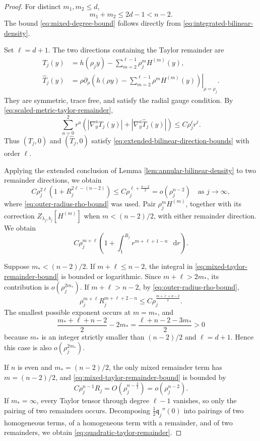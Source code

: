 \documentclass[11pt]{article}
\numberwithin{equation}{section}
\theoremstyle{remark}
\newcommand{\dd}{\mathop{}\!\mathrm{d}}
\begin{document}
\begin{proof}
For distinct \(m_1,m_2\le d\),
\[
 m_1+m_2\le2d-1<n-2.
\]
{The bound \eqref{eq:mixed-degree-bound} follows directly
from \eqref{eq:integrated-bilinear-density}.}

{Set \(\ell=d+1\).}
The two directions containing the Taylor remainder are
\[
 \begin{aligned}
 T_j(y)
 &=
 h(\rho_jy)-\sum_{m=2}^{\ell-1}\rho_j^mH^{(m)}(y),\\
 \widehat T_j(y)
 &=
 \left.\rho\partial_\rho\left(
 h(\rho y)-\sum_{m=2}^{\ell-1}\rho^mH^{(m)}(y)
 \right)\right|_{\rho=\rho_j}.
 \end{aligned}
\]
They are symmetric, trace free, and satisfy the radial gauge condition.
{By \eqref{eq:scaled-metric-taylor-remainder},}
\[
 \sum_{a=0}^2r^a
\left(
 |\nabla_y^aT_j(y)|
 +|\nabla_y^a\widehat T_j(y)|
\right)
 \le C\rho_j^{\ell}r^{\ell}.
\]
Thus \((T_j,0)\) and \((\widehat T_j,0)\) satisfy
\eqref{eq:extended-bilinear-direction-bounds} with order \(\ell\).

{Applying the extended conclusion of Lemma
\ref{lem:annular-bilinear-density} to two remainder directions, we obtain}
\[
 C\rho_j^{2\ell}
 \left(1+R_j^{2\ell-(n-2)}\right)
 \le
 C\rho_j^{\ell+\frac{n-2}{2}}
 =o(\rho_j^{n-2})
 \quad\text{as }j\to\infty,
\]
where \eqref{eq:outer-radius-rho-bound} was used.  {Pair
\(\rho_j^mH^{(m)}\), together with its correction
\(Z_{\lambda_j,b_j}[H^{(m)}]\) when
\(m<(n-2)/2\), with either remainder direction. We obtain}
\begin{equation}\label{eq:mixed-taylor-remainder-bound}
 C\rho_j^{m+\ell}
 \left(1+\int_1^{R_j}r^{m+\ell+1-n}\,\dd r\right).
\end{equation}

Suppose \(m_*<(n-2)/2\). If \(m+\ell\le n-2\), the integral in
\eqref{eq:mixed-taylor-remainder-bound} is bounded or logarithmic.
Since \(m+\ell>2m_*\), its contribution is \(o(\rho_j^{2m_*})\).
{If \(m+\ell>n-2\), by
\eqref{eq:outer-radius-rho-bound},}
\[
 \rho_j^{m+\ell}R_j^{m+\ell+2-n}
 \le
 C\rho_j^{\frac{m+\ell+n-2}{2}}.
\]
The smallest possible exponent occurs at \(m=m_*\), and
\[
 \frac{m_*+\ell+n-2}{2}-2m_*
 =
 \frac{\ell+n-2-3m_*}{2}>0
\]
because \(m_*\) is an integer strictly smaller than \((n-2)/2\) and
\(\ell=d+1\).  Hence this case is also
\(o(\rho_j^{2m_*})\).

If \(n\) is even and \(m_*=(n-2)/2\), the only mixed remainder term has
\(m=(n-2)/2\), and \eqref{eq:mixed-taylor-remainder-bound} is bounded by
\[
 C\rho_j^{n-1}R_j
 =O(\rho_j^{n-\frac32})
 =o(\rho_j^{n-2}).
\]
If \(m_*=\infty\), every Taylor tensor through degree \(\ell-1\) vanishes, so
only the pairing of two remainders occurs.
{Decomposing \(\frac{1}{2}\mathfrak q_j''(0)\) into pairings
of two homogeneous terms, of a homogeneous term with a remainder, and of
two remainders, we obtain
\eqref{eq:quadratic-taylor-remainder}.}
\end{proof}
\end{document}
